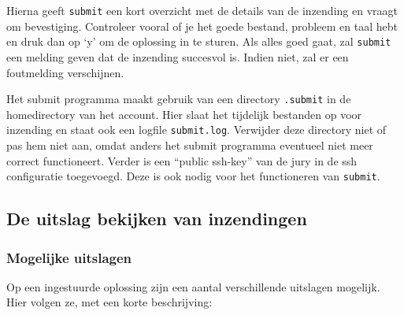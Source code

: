 \documentclass[11pt,titlepage,a4paper]{article}
\begin{document}
Hierna geeft \texttt{submit} een kort overzicht met de details van de
inzending en vraagt om bevestiging. Controleer vooral of je het goede
bestand, probleem en taal hebt en druk dan op `y' om de oplossing in
te sturen. Als alles goed gaat, zal \texttt{submit} een melding geven
dat de inzending succesvol is. Indien niet, zal er een foutmelding
verschijnen.

Het submit programma maakt gebruik van een directory \texttt{.submit}
in de homedirectory van het account. Hier slaat het tijdelijk
bestanden op voor inzending en staat ook een logfile \texttt{submit.log}.
Verwijder deze directory niet of pas hem niet aan, omdat anders het
submit programma eventueel niet meer correct functioneert. Verder
is een ``public ssh-key'' van de jury in de ssh configuratie
toegevoegd. Deze is ook nodig voor het functioneren van \texttt{submit}.
 
\subsection{De uitslag bekijken van inzendingen}

\subsubsection{Mogelijke uitslagen}

Op een ingestuurde oplossing zijn een aantal verschillende uitslagen
mogelijk. Hier volgen ze, met een korte beschrijving:
\end{document}
